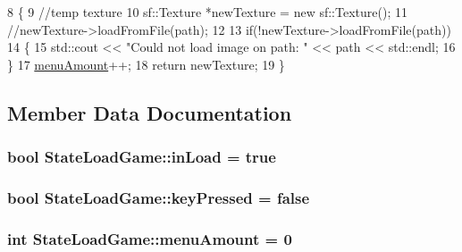 \begin{DoxyCode}
8 \{
9     \textcolor{comment}{//temp texture}
10     sf::Texture *newTexture = \textcolor{keyword}{new} sf::Texture();
11     \textcolor{comment}{//newTexture->loadFromFile(path);}
12 
13     \textcolor{keywordflow}{if}(!newTexture->loadFromFile(path))
14     \{
15         std::cout << \textcolor{stringliteral}{"Could not load image on path: "} << path << std::endl;
16     \}
17     \hyperlink{classStateLoadGame_a89730ad10d5c75a3ce4c0d8a0c6f4b79}{menuAmount}++;
18     \textcolor{keywordflow}{return} newTexture;
19 \}
\end{DoxyCode}


\subsection{Member Data Documentation}
\subsubsection[{\texorpdfstring{in\+Load}{inLoad}}]{\setlength{\rightskip}{0pt plus 5cm}bool State\+Load\+Game\+::in\+Load = true\hspace{0.3cm}{\ttfamily [protected]}}\hypertarget{classStateLoadGame_af05aaa81fec05eb682e63515a2371817}{}\label{classStateLoadGame_af05aaa81fec05eb682e63515a2371817}
\subsubsection[{\texorpdfstring{key\+Pressed}{keyPressed}}]{\setlength{\rightskip}{0pt plus 5cm}bool State\+Load\+Game\+::key\+Pressed = false\hspace{0.3cm}{\ttfamily [protected]}}\hypertarget{classStateLoadGame_a6c57b0302c417a8921a20bdb27d46e6c}{}\label{classStateLoadGame_a6c57b0302c417a8921a20bdb27d46e6c}
\subsubsection[{\texorpdfstring{menu\+Amount}{menuAmount}}]{\setlength{\rightskip}{0pt plus 5cm}int State\+Load\+Game\+::menu\+Amount = 0\hspace{0.3cm}{\ttfamily [protected]}}\hypertarget{classStateLoadGame_a89730ad10d5c75a3ce4c0d8a0c6f4b79}{}\label{classStateLoadGame_a89730ad10d5c75a3ce4c0d8a0c6f4b79}

